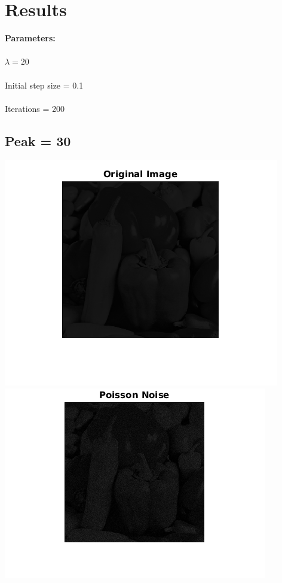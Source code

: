 \documentclass{article}
\begin{document}
\section*{Results}

\textbf{Parameters:}\\
\\
$ \lambda = 20 $\\
\\
Initial step size = 0.1\\
\\
Iterations = 200\\

\subsection*{Peak = 30}
\includegraphics[scale=0.5]{images/peak30_orig}
\includegraphics[scale=0.5]{images/peak30_noisy}
\end{document}
